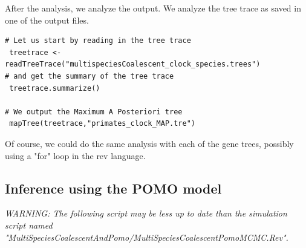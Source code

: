 \documentclass[11pt]{article}
\begin{document}
{\begin{framed}
After the analysis, we analyze the output. We analyze the tree trace as saved in one of the output files.
{\tt \begin{snugshade*}
\begin{lstlisting}
# Let us start by reading in the tree trace
 treetrace <- readTreeTrace("multispeciesCoalescent_clock_species.trees")
# and get the summary of the tree trace
 treetrace.summarize()

# We output the Maximum A Posteriori tree
 mapTree(treetrace,"primates_clock_MAP.tre")

\end{lstlisting}
\end{snugshade*}}

Of course, we could do the same analysis with each of the gene trees, possibly using a "for" loop in the rev language.

\end{framed}}

\subsection{Inference using the POMO model }

{\begin{framed}
\begin{center}
\emph{WARNING: The following script may be less up to date than the simulation script named "MultiSpeciesCoalescentAndPomo/MultiSpeciesCoalescentPomoMCMC.Rev".}
\end{center}
\end{framed}}
\vspace{5mm}
\end{document}
